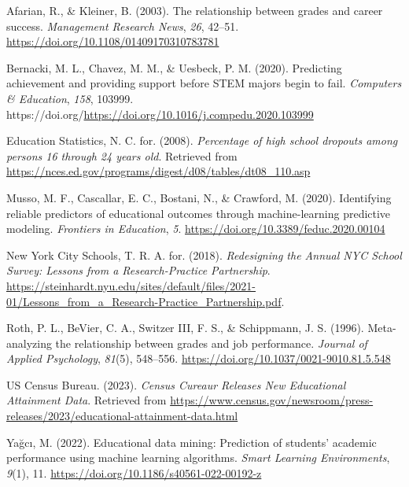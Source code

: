 \documentclass[
  man,floatsintext]{apa6}
\newlength{\cslhangindent}
\newlength{\cslentryspacingunit} %
\newenvironment{CSLReferences}[2] %
 {%
  \setlength{\parindent}{0pt}
  \ifodd #1
  \let\oldpar\par
  \def\par{\hangindent=\cslhangindent\oldpar}
  \fi
  \setlength{\parskip}{#2\cslentryspacingunit}
 }%
 {}
\begin{document}
\hypertarget{refs}{}
\begin{CSLReferences}{1}{0}
\leavevmode{}%
Afarian, R., \& Kleiner, B. (2003). The relationship between grades and career success. \emph{Management Research News}, \emph{26}, 42--51. \url{https://doi.org/10.1108/01409170310783781}

\leavevmode{}%
Bernacki, M. L., Chavez, M. M., \& Uesbeck, P. M. (2020). Predicting achievement and providing support before STEM majors begin to fail. \emph{Computers \& Education}, \emph{158}, 103999. https://doi.org/\url{https://doi.org/10.1016/j.compedu.2020.103999}

\leavevmode{}%
Education Statistics, N. C. for. (2008). \emph{Percentage of high school dropouts among persons 16 through 24 years old}. Retrieved from \url{https://nces.ed.gov/programs/digest/d08/tables/dt08_110.asp}

\leavevmode{}%
Musso, M. F., Cascallar, E. C., Bostani, N., \& Crawford, M. (2020). Identifying reliable predictors of educational outcomes through machine-learning predictive modeling. \emph{Frontiers in Education}, \emph{5}. \url{https://doi.org/10.3389/feduc.2020.00104}

\leavevmode{}%
New York City Schools, T. R. A. for. (2018). \emph{{R}edesigning the {A}nnual {N}{Y}{C} {S}chool {S}urvey: {L}essons from a {R}esearch-{P}ractice {P}artnership}. \url{https://steinhardt.nyu.edu/sites/default/files/2021-01/Lessons_from_a_Research-Practice_Partnership.pdf}.

\leavevmode{}%
Roth, P. L., BeVier, C. A., Switzer III, F. S., \& Schippmann, J. S. (1996). Meta-analyzing the relationship between grades and job performance. \emph{Journal of Applied Psychology}, \emph{81}(5), 548--556. \url{https://doi.org/10.1037/0021-9010.81.5.548}

\leavevmode{}%
US Census Bureau. (2023). \emph{Census {Cureaur} {Releases} {New} {Educational} {Attainment} {Data}}. Retrieved from \url{https://www.census.gov/newsroom/press-releases/2023/educational-attainment-data.html}

\leavevmode{}%
Yağcı, M. (2022). Educational data mining: Prediction of students' academic performance using machine learning algorithms. \emph{Smart Learning Environments}, \emph{9}(1), 11. \url{https://doi.org/10.1186/s40561-022-00192-z}

\end{CSLReferences}
\end{document}
